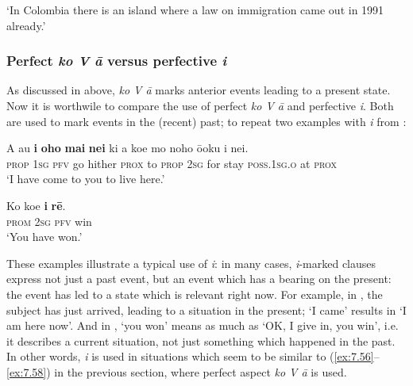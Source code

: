 \glt 
‘In Colombia there is an island where a law on immigration came out in 1991 already.’ \textstyleExampleref{[R649.231]} 
\z

\subsubsection[Perfect ko V {\ꞌ}ā versus perfective i]{Perfect \textit{ko V {\ꞌ}ā} versus perfective \textit{i}}\label{sec:7.2.7.4}

As discussed in  above, \textit{ko V {\ꞌ}ā} marks anterior events leading to a present state. Now it is worthwile to compare the use of perfect \textit{ko V {\ꞌ}ā} and perfective \textit{i}. Both are used to mark events in the (recent) past; to repeat two examples with \textit{i} from :


\ea\label{ex:7.74}
\gll A au \textbf{i} \textbf{oho} \textbf{mai} \textbf{nei} ki a koe mo noho ō{\ꞌ}oku {\ꞌ}i nei. \\
\textsc{prop} \textsc{1sg} \textsc{pfv} go hither \textsc{prox} to \textsc{prop} \textsc{2sg} for stay \textsc{poss.1sg.o} at \textsc{prox} \\

\glt 
‘I have come to you to live here.’ \textstyleExampleref{[R245.072]} 
\z

\ea\label{ex:7.75}
\gll Ko koe \textbf{i} \textbf{rē}. \\
\textsc{prom} \textsc{2sg} \textsc{pfv} win \\

\glt
‘You have won.’ \textstyleExampleref{[R210.071]} 
\z

These examples illustrate a typical use of \textit{i}: in many cases, \textit{i}{}-marked clauses express not just a past event, but an event which has a bearing on the present: the event has led to a state which is relevant right now. For example, in , the subject has just arrived, leading to a situation in the present; ‘I came’ results in ‘I am here now’. And in , ‘you won’ means as much as ‘OK, I give in, you win’, i.e. it describes a current situation, not just something which happened in the past. In other words, \textit{i} is used in situations which seem to be similar to (\ref{ex:7.56}–\ref{ex:7.58}) in the previous section, where perfect aspect \textit{ko V {\ꞌ}ā} is used. 

